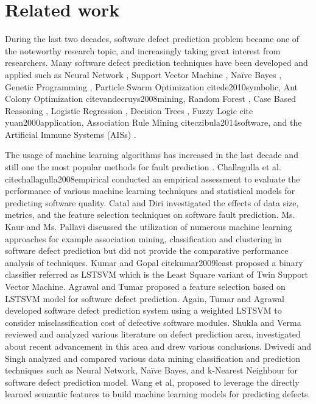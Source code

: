 \documentclass[runningheads,a4paper]{llncs}
\begin{document}
\section{Related work}

During the last two decades, software defect prediction problem became one of the noteworthy research topic, and increasingly taking great interest from researchers. Many software defect prediction techniques have been developed and applied such as Neural Network \cite{quah2003application}, Support Vector Machine \cite{elish2008predicting}, Naïve Bayes \cite{menzies2007data}, Genetic Programming \cite{evett1998gp}, Particle Swarm Optimization cite{de2010symbolic}, Ant Colony Optimization cite{vandecruys2008mining}, Random Forest \cite{koru2005building}, Case Based Reasoning \cite{el2001comparing}, Logistic Regression \cite{suffian2014prediction}, Decision Trees \cite{koprinska2007learning}, Fuzzy Logic cite{ yuan2000application}, Association Rule Mining cite{czibula2014software}, and the Artificial Immune Systems (AISs) \cite{catal2007software2,catal2007software,catal2008fault}. 

The usage of machine learning algorithms has increased in the last decade and still one the most popular methods for fault prediction \cite{catal2011practical}. Challagulla et al. cite{challagulla2008empirical} conducted an empirical assessment to evaluate the performance of various machine learning techniques and statistical models for predicting software quality. Catal and Diri \cite{catal2009investigating} investigated the effects of data size, metrics, and the feature selection techniques on software fault prediction. Ms. Kaur and Ms. Pallavi \cite{kaur2013data} discussed the utilization of numerous machine learning approaches for example association mining, classification and clustering in software defect prediction but did not provide the comparative performance analysis of techniques. Kumar and Gopal cite{kumar2009least} proposed a binary classifier referred as LSTSVM which is the Least Square variant of Twin Support Vector Machine. Agrawal and Tumar \cite{agarwal2014feature} proposed a feature selection based on LSTSVM model for software defect prediction. Again, Tumar and Agrawal \cite{tomar2016prediction}developed software defect prediction system using a weighted LSTSVM to consider misclassification cost of defective software modules. Shukla and Verma \cite{shuklareview}reviewed and analyzed various literature on defect prediction area, investigated about recent advancement in this area and drew various conclusions. Dwivedi and Singh \cite{kumarsoftware} analyzed and compared various data mining classification and prediction techniques such as Neural Network, Naïve Bayes, and k-Nearest Neighbour for software defect prediction model. Wang et al, \cite{wang2016automatically} proposed to leverage the directly learned semantic features to build machine learning models for predicting defects.
\end{document}
